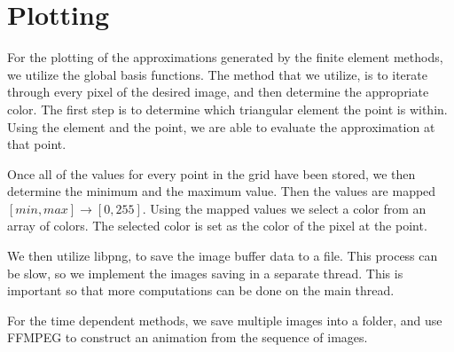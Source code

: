 \documentclass[../fem.tex]{subfile}
\begin{document}
\section{Plotting}%
\label{sec:plotting}

For the plotting of the approximations generated by the finite element methods,
we utilize the global basis functions. The method that we utilize, is to
iterate through every pixel of the desired image, and then determine the
appropriate color. The first step is to determine which triangular element the
point is within. Using the element and the point, we are able to evaluate the
approximation at that point.

Once all of the values for every point in the grid have been stored, we then
determine the minimum and the maximum value. Then the values are mapped
$[min,max]\rightarrow[0,255]$. Using the mapped values we select a color from
an array of colors. The selected color is set as the color of the pixel at the
point.

We then utilize libpng\cite{PNG}, to save the image buffer data to a file. This
process can be slow, so we implement the images saving in a separate thread.
This is important so that more computations can be done on the main thread.

For the time dependent methods, we save multiple images into a folder, and use
FFMPEG\cite{FFMPEG} to construct an animation from the sequence of images.
\end{document}
